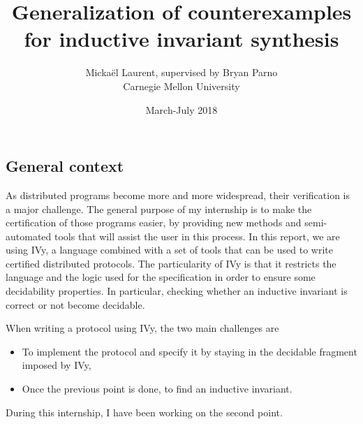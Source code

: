 \documentclass{article}
\newenvironment{point}[1]%
{\subsection*{#1}}%
{}
\begin{document}

\title{Generalization of counterexamples for inductive invariant synthesis}

\author{Mickaël Laurent, supervised by Bryan Parno\\Carnegie Mellon University}

\date{March-July 2018}

\maketitle

\pagestyle{empty} %
\thispagestyle{empty}



\begin{point}{General context}
  
  As distributed programs become more and more widespread, their verification is a major challenge.
  The general purpose of my internship is to make the certification of those programs easier, by providing new methods and semi-automated tools that will assist the user in this process.
  In this report, we are using IVy, a language combined with a set of tools that can be used to write certified distributed protocols.
  The particularity of IVy is that it restricts the language and the logic used for the specification in order to ensure some decidability properties.
  In particular, checking whether an inductive invariant is correct or not become decidable.

  When writing a protocol using IVy, the two main challenges are
  \begin{itemize}
    \item To implement the protocol and specify it by staying in the decidable fragment imposed by IVy,
    \item Once the previous point is done, to find an inductive invariant.
  \end{itemize}

  During this internship, I have been working on the second point.

\end{point}
\end{document}
